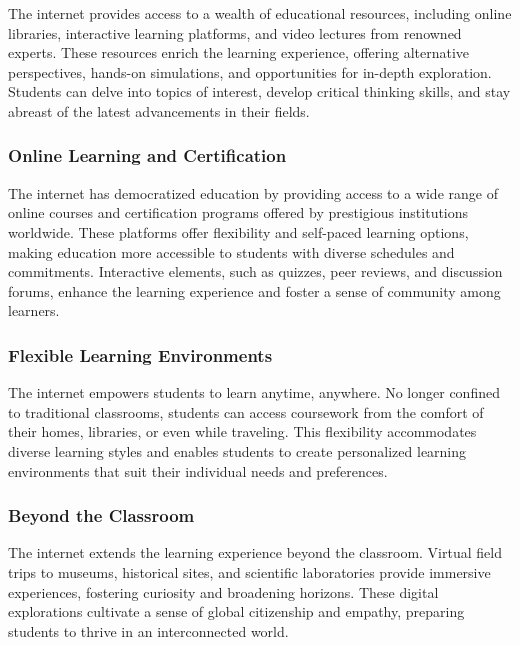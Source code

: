 \documentclass[a4paper,11pt]{article}
\begin{document}
The internet provides access to a wealth of educational resources, including online libraries, interactive learning platforms, and video lectures from renowned experts. These resources enrich the learning experience, offering alternative perspectives, hands-on simulations, and opportunities for in-depth exploration. Students can delve into topics of interest, develop critical thinking skills, and stay abreast of the latest advancements in their fields.

\subsubsection {Online Learning and Certification}

The internet has democratized education by providing access to a wide range of online courses and certification programs offered by prestigious institutions worldwide. These platforms offer flexibility and self-paced learning options, making education more accessible to students with diverse schedules and commitments. Interactive elements, such as quizzes, peer reviews, and discussion forums, enhance the learning experience and foster a sense of community among learners.\cite{importance-reliable-internet-student}

\subsubsection{Flexible Learning Environments}

The internet empowers students to learn anytime, anywhere. No longer confined to traditional classrooms, students can access coursework from the comfort of their homes, libraries, or even while traveling. This flexibility accommodates diverse learning styles and enables students to create personalized learning environments that suit their individual needs and preferences.\cite{importance-reliable-internet-student}

\subsubsection{Beyond the Classroom}

The internet extends the learning experience beyond the classroom. Virtual field trips to museums, historical sites, and scientific laboratories provide immersive experiences, fostering curiosity and broadening horizons. These digital explorations cultivate a sense of global citizenship and empathy, preparing students to thrive in an interconnected world.
\end{document}
